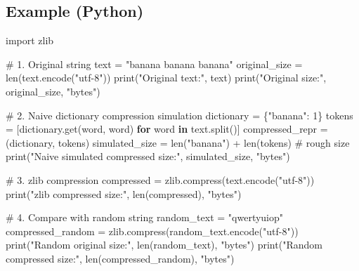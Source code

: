 \documentclass[
  letterpaper,
  DIV=11,
  numbers=noendperiod]{scrreprt}
\newenvironment{Shaded}{\begin{snugshade}}{\end{snugshade}}
\newcommand{\BuiltInTok}[1]{\textcolor[rgb]{0.00,0.23,0.31}{#1}}
\newcommand{\CommentTok}[1]{\textcolor[rgb]{0.37,0.37,0.37}{#1}}
\newcommand{\ControlFlowTok}[1]{\textcolor[rgb]{0.00,0.23,0.31}{\textbf{#1}}}
\newcommand{\DecValTok}[1]{\textcolor[rgb]{0.68,0.00,0.00}{#1}}
\newcommand{\ImportTok}[1]{\textcolor[rgb]{0.00,0.46,0.62}{#1}}
\newcommand{\KeywordTok}[1]{\textcolor[rgb]{0.00,0.23,0.31}{\textbf{#1}}}
\newcommand{\NormalTok}[1]{\textcolor[rgb]{0.00,0.23,0.31}{#1}}
\newcommand{\OperatorTok}[1]{\textcolor[rgb]{0.37,0.37,0.37}{#1}}
\newcommand{\StringTok}[1]{\textcolor[rgb]{0.13,0.47,0.30}{#1}}
\begin{document}
\subsection{Example (Python)}\label{example-python-12}

\begin{Shaded}
\begin{Highlighting}[]
\ImportTok{import}\NormalTok{ zlib}

\CommentTok{\# 1. Original string}
\NormalTok{text }\OperatorTok{=} \StringTok{"banana banana banana"}
\NormalTok{original\_size }\OperatorTok{=} \BuiltInTok{len}\NormalTok{(text.encode(}\StringTok{"utf{-}8"}\NormalTok{))}
\BuiltInTok{print}\NormalTok{(}\StringTok{"Original text:"}\NormalTok{, text)}
\BuiltInTok{print}\NormalTok{(}\StringTok{"Original size:"}\NormalTok{, original\_size, }\StringTok{"bytes"}\NormalTok{)}

\CommentTok{\# 2. Naive dictionary compression simulation}
\NormalTok{dictionary }\OperatorTok{=}\NormalTok{ \{}\StringTok{"banana"}\NormalTok{: }\DecValTok{1}\NormalTok{\}}
\NormalTok{tokens }\OperatorTok{=}\NormalTok{ [dictionary.get(word, word) }\ControlFlowTok{for}\NormalTok{ word }\KeywordTok{in}\NormalTok{ text.split()]}
\NormalTok{compressed\_repr }\OperatorTok{=}\NormalTok{ (dictionary, tokens)}
\NormalTok{simulated\_size }\OperatorTok{=} \BuiltInTok{len}\NormalTok{(}\StringTok{"banana"}\NormalTok{) }\OperatorTok{+} \BuiltInTok{len}\NormalTok{(tokens)  }\CommentTok{\# rough size}
\BuiltInTok{print}\NormalTok{(}\StringTok{"Naive simulated compressed size:"}\NormalTok{, simulated\_size, }\StringTok{"bytes"}\NormalTok{)}

\CommentTok{\# 3. zlib compression}
\NormalTok{compressed }\OperatorTok{=}\NormalTok{ zlib.compress(text.encode(}\StringTok{"utf{-}8"}\NormalTok{))}
\BuiltInTok{print}\NormalTok{(}\StringTok{"zlib compressed size:"}\NormalTok{, }\BuiltInTok{len}\NormalTok{(compressed), }\StringTok{"bytes"}\NormalTok{)}

\CommentTok{\# 4. Compare with random string}
\NormalTok{random\_text }\OperatorTok{=} \StringTok{"qwertyuiop"}
\NormalTok{compressed\_random }\OperatorTok{=}\NormalTok{ zlib.compress(random\_text.encode(}\StringTok{"utf{-}8"}\NormalTok{))}
\BuiltInTok{print}\NormalTok{(}\StringTok{"Random original size:"}\NormalTok{, }\BuiltInTok{len}\NormalTok{(random\_text), }\StringTok{"bytes"}\NormalTok{)}
\BuiltInTok{print}\NormalTok{(}\StringTok{"Random compressed size:"}\NormalTok{, }\BuiltInTok{len}\NormalTok{(compressed\_random), }\StringTok{"bytes"}\NormalTok{)}
\end{Highlighting}
\end{Shaded}
\end{document}
